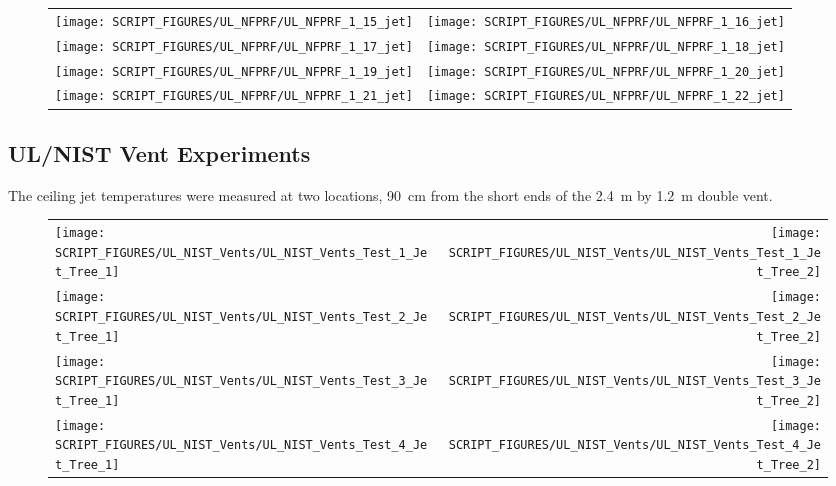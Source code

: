 \begin{figure}[p]
\begin{tabular*}{\textwidth}{l@{\extracolsep{\fill}}r}
\texttt{[image: SCRIPT\_FIGURES/UL\_NFPRF/UL\_NFPRF\_1\_15\_jet]} &
\texttt{[image: SCRIPT\_FIGURES/UL\_NFPRF/UL\_NFPRF\_1\_16\_jet]} \\
\texttt{[image: SCRIPT\_FIGURES/UL\_NFPRF/UL\_NFPRF\_1\_17\_jet]} &
\texttt{[image: SCRIPT\_FIGURES/UL\_NFPRF/UL\_NFPRF\_1\_18\_jet]} \\
\texttt{[image: SCRIPT\_FIGURES/UL\_NFPRF/UL\_NFPRF\_1\_19\_jet]} &
\texttt{[image: SCRIPT\_FIGURES/UL\_NFPRF/UL\_NFPRF\_1\_20\_jet]} \\
\texttt{[image: SCRIPT\_FIGURES/UL\_NFPRF/UL\_NFPRF\_1\_21\_jet]} &
\texttt{[image: SCRIPT\_FIGURES/UL\_NFPRF/UL\_NFPRF\_1\_22\_jet]}
\end{tabular*}
\label{UL_NFPRF_jet_3}
\end{figure}


\clearpage

\subsection{UL/NIST Vent Experiments}

The ceiling jet temperatures were measured at two locations, 90~cm from the short ends of the 2.4~m by 1.2~m double vent.

\newpage

\begin{figure}[p]
\begin{tabular*}{\textwidth}{l@{\extracolsep{\fill}}r}
\texttt{[image: SCRIPT\_FIGURES/UL\_NIST\_Vents/UL\_NIST\_Vents\_Test\_1\_Jet\_Tree\_1]} &
\texttt{[image: SCRIPT\_FIGURES/UL\_NIST\_Vents/UL\_NIST\_Vents\_Test\_1\_Jet\_Tree\_2]} \\
\texttt{[image: SCRIPT\_FIGURES/UL\_NIST\_Vents/UL\_NIST\_Vents\_Test\_2\_Jet\_Tree\_1]} &
\texttt{[image: SCRIPT\_FIGURES/UL\_NIST\_Vents/UL\_NIST\_Vents\_Test\_2\_Jet\_Tree\_2]} \\
\texttt{[image: SCRIPT\_FIGURES/UL\_NIST\_Vents/UL\_NIST\_Vents\_Test\_3\_Jet\_Tree\_1]} &
\texttt{[image: SCRIPT\_FIGURES/UL\_NIST\_Vents/UL\_NIST\_Vents\_Test\_3\_Jet\_Tree\_2]} \\
\texttt{[image: SCRIPT\_FIGURES/UL\_NIST\_Vents/UL\_NIST\_Vents\_Test\_4\_Jet\_Tree\_1]} &
\texttt{[image: SCRIPT\_FIGURES/UL\_NIST\_Vents/UL\_NIST\_Vents\_Test\_4\_Jet\_Tree\_2]}
\end{tabular*}
\label{UL_NIST_Ceiling_Jet}
\end{figure}


